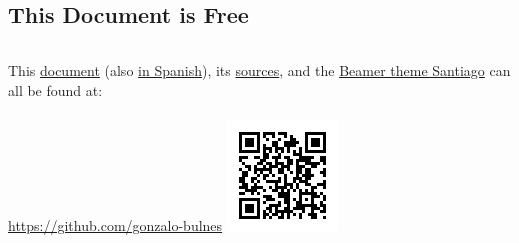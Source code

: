 %
\subsection{This Document is Free}


  \begin{frame}{\insertsubsection}

    \footnotesize
      \begin{columns}
          This \href{https://github.com/gonzalo-bulnes/you-dont-know-everything/raw/master/YDNE.pdf}{document} (also \href{https://github.com/gonzalo-bulnes/you-dont-know-everything/raw/master/YDNE-es.pdf}{in Spanish}), its \href{https://github.com/gonzalo-bulnes/you-dont-know-everything}{sources}, and the \href{https://github.com/gonzalo-bulnes/santiago-beamer-theme}{Beamer theme Santiago} can all be found at:\\~\\
          \url{https://github.com/gonzalo-bulnes}
        \hfill\includegraphics[width=\textwidth]{../images/sources-talk.png}
      \end{columns}
    \normalsize


\end{frame}
